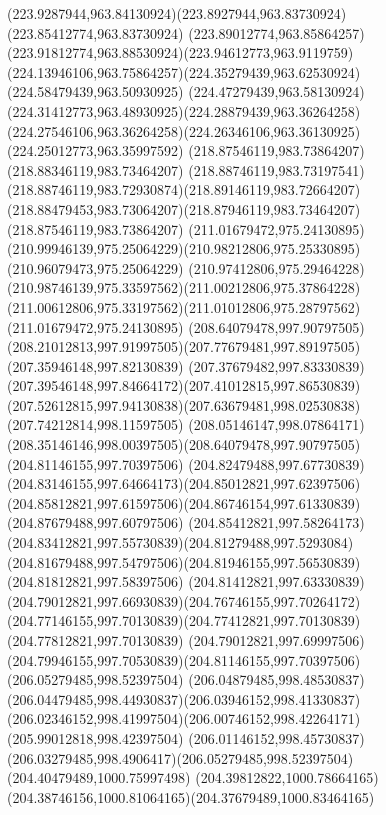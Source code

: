 {    \curveto(223.9287944,963.84130924)(223.8927944,963.83730924)(223.85412774,963.83730924)
    \curveto(223.89012774,963.85864257)(223.91812774,963.88530924)(223.94612773,963.9119759)
    \curveto(224.13946106,963.75864257)(224.35279439,963.62530924)(224.58479439,963.50930925)
    \curveto(224.47279439,963.58130924)(224.31412773,963.48930925)(224.28879439,963.36264258)
    \curveto(224.27546106,963.36264258)(224.26346106,963.36130925)(224.25012773,963.35997592)
    \moveto(218.87546119,983.73864207)
    \lineto(218.88346119,983.73464207)
    \curveto(218.88746119,983.73197541)(218.88746119,983.72930874)(218.89146119,983.72664207)
    \curveto(218.88479453,983.73064207)(218.87946119,983.73464207)(218.87546119,983.73864207)
    \moveto(211.01679472,975.24130895)
    \curveto(210.99946139,975.25064229)(210.98212806,975.25330895)(210.96079473,975.25064229)
    \curveto(210.97412806,975.29464228)(210.98746139,975.33597562)(211.00212806,975.37864228)
    \curveto(211.00612806,975.33197562)(211.01012806,975.28797562)(211.01679472,975.24130895)
    \moveto(208.64079478,997.90797505)
    \curveto(208.21012813,997.91997505)(207.77679481,997.89197505)(207.35946148,997.82130839)
    \curveto(207.37679482,997.83330839)(207.39546148,997.84664172)(207.41012815,997.86530839)
    \curveto(207.52612815,997.94130838)(207.63679481,998.02530838)(207.74212814,998.11597505)
    \curveto(208.05146147,998.07864171)(208.35146146,998.00397505)(208.64079478,997.90797505)
    \moveto(204.81146155,997.70397506)
    \curveto(204.82479488,997.67730839)(204.83146155,997.64664173)(204.85012821,997.62397506)
    \curveto(204.85812821,997.61597506)(204.86746154,997.61330839)(204.87679488,997.60797506)
    \curveto(204.85412821,997.58264173)(204.83412821,997.55730839)(204.81279488,997.5293084)
    \curveto(204.81679488,997.54797506)(204.81946155,997.56530839)(204.81812821,997.58397506)
    \curveto(204.81412821,997.63330839)(204.79012821,997.66930839)(204.76746155,997.70264172)
    \curveto(204.77146155,997.70130839)(204.77412821,997.70130839)(204.77812821,997.70130839)
    \curveto(204.79012821,997.69997506)(204.79946155,997.70530839)(204.81146155,997.70397506)
    \moveto(206.05279485,998.52397504)
    \curveto(206.04879485,998.48530837)(206.04479485,998.44930837)(206.03946152,998.41330837)
    \curveto(206.02346152,998.41997504)(206.00746152,998.42264171)(205.99012818,998.42397504)
    \curveto(206.01146152,998.45730837)(206.03279485,998.4906417)(206.05279485,998.52397504)
    \moveto(204.40479489,1000.75997498)
    \curveto(204.39812822,1000.78664165)(204.38746156,1000.81064165)(204.37679489,1000.83464165)
}
